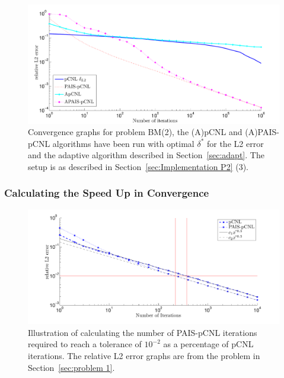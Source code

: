 \documentclass[final]{siamltex}
\begin{document}
\begin{figure}
\begin{center}
\includegraphics[width=\textwidth]{"figures/BM2_AL2"}
\caption{Convergence graphs for problem BM(2), the (A)pCNL and (A)PAIS-pCNL algorithms have been run with optimal $\delta^*$ for the L2 error and the adaptive algorithm described in Section~\ref{sec:adapt}. The setup is as described in Section~\ref{sec:Implementation P2} (3).}
\label{fig:BM2_AL2}
\end{center}
\end{figure}

\subsubsection{Calculating the Speed Up in Convergence}\label{sec:calc_saving}

\begin{figure}
\begin{center}
\includegraphics[width=\textwidth]{"figures/calc_saving"}
\caption{Illustration of calculating the number of PAIS-pCNL iterations required to reach a tolerance of $10^{-2}$ as a percentage of pCNL iterations. The relative L2 error graphs are from the problem in Section~\ref{sec:problem 1}.}
\label{fig:calc_saving}
\end{center}
\end{figure}
\end{document}
